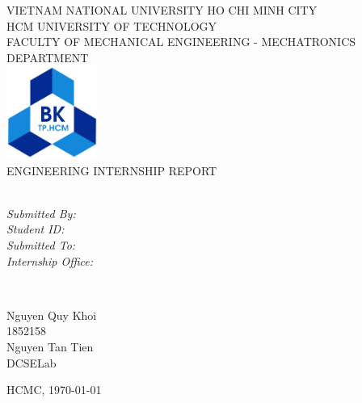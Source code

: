 \documentclass{presets}
\begin{document}
	\begin{titlepage}
		\centering
		\small VIETNAM NATIONAL UNIVERSITY HO CHI MINH CITY\\
		HCM UNIVERSITY OF TECHNOLOGY\\
		FACULTY OF MECHANICAL ENGINEERING - MECHATRONICS DEPARTMENT\\[2cm]
		
		\includegraphics[width=3cm]{logo.png}\\[2 cm]	%
		\normalsize ENGINEERING INTERNSHIP REPORT\\[1 cm]
		{\huge \bfseries \thetitle}\\[2cm]
		
		\begin{minipage}[t]{0.4\textwidth}
			\begin{flushleft} \large
				\emph{Submitted By:}\\
				\emph{Student ID:}\\
				\emph{Submitted To:}\\
				\emph{Internship Office:}\\
			\end{flushleft}
		\end{minipage}~
		\begin{minipage}[t]{0.4\textwidth}
			
			\begin{flushright} \large
				Nguyen Quy Khoi\\
				1852158\\
				Nguyen Tan Tien\\
				DCSELab\\
			\end{flushright}
			
		\end{minipage}
		\mbox{}\vfill
		{\large HCMC, \today}
	\end{titlepage}
	\tableofcontents
	\listoffigures
	
	\clearpage
\end{document}

